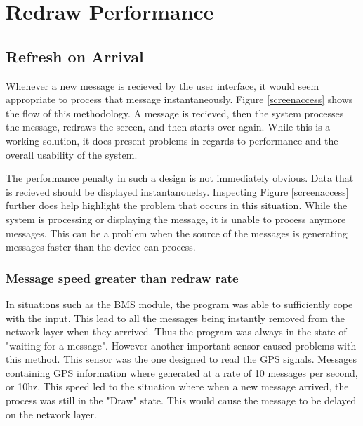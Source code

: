 

\section{Redraw Performance}

\subsection{Refresh on Arrival}

Whenever a new message is recieved by the user interface, it would seem appropriate to process that message instantaneously. Figure \ref{screenaccess} shows the flow of this methodology. A message is recieved, then the system processes the message, redraws the screen, and then starts over again. While this is a working solution, it does present problems in regards to performance and the overall usability of the system.


The performance penalty in such a design is not immediately obvious. Data that is recieved should be displayed instantanouelsy. Inspecting Figure \ref{screenaccess} further does help highlight the problem that occurs in this situation. While the system is processing or displaying the message, it is unable to process anymore messages. This can be a problem when the source of the messages is generating messages faster than the device can process.

\subsubsection{Message speed greater than redraw rate}

In situations such as the BMS module, the program was able to sufficiently cope with the input. This lead to all the messages being instantly removed from the network layer when they arrrived. Thus the program was always in the state of "waiting for a message". However another important sensor caused problems with this method. This sensor was the one designed to read the GPS signals. Messages containing GPS information where generated at a rate of 10 messages per second, or 10hz. This speed led to the situation where when a new message arrived, the process was still in the "Draw" state. This would cause the message to be delayed on the network layer.

